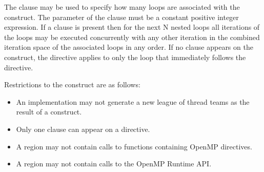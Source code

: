 The  clause may be used to specify how many loops are associated
with the  construct. The parameter of the 
clause must be a constant positive integer expression. If a 
clause is present then for the next N nested loops all iterations of the loops
may be executed concurrently with any other iteration in the combined
iteration space of the associated loops in any order. If no 
clause appears on the construct, the  directive applies to
only the loop that immediately follows the directive.


\restrictions
Restrictions to the  construct are as follows:

\begin{itemize}
  \item An implementation may not generate a new league of thread teams
    as the result of a  construct.

  \item Only one  clause can appear on a  directive.
  

  \item A  region may not contain calls to functions containing
    OpenMP directives. %
    

  \item A  region may not contain calls to the OpenMP Runtime
    API.

\end{itemize}


